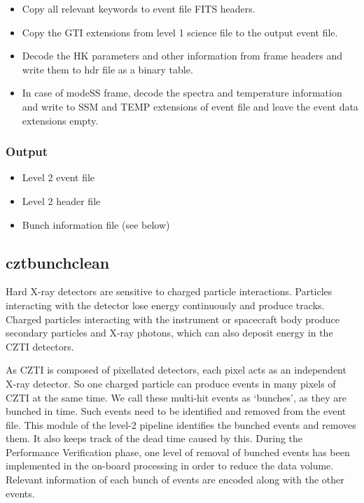 \documentclass[11pt,oneside,a4paper]{article}
\begin{document}
\begin{itemize}
\item{Copy all relevant keywords to event file FITS headers.}

\item{Copy the GTI extensions from level 1 science file to the output event file.}

\item{Decode the HK parameters and other information from frame headers and write them to hdr file
as a binary table.}

\item{In case of modeSS frame, decode the spectra and temperature information and write to SSM and TEMP extensions 
of event file and leave the event data extensions empty.}

\end{itemize}
\subsubsection*{Output}
\begin{itemize}
\item{Level 2 event file}
\item{Level 2 header file}
\item{Bunch information file} (see below)
\end{itemize}


\subsection{cztbunchclean}
Hard X-ray detectors are sensitive to charged particle interactions. Particles 
interacting with the detector lose energy continuously and produce tracks.
Charged particles interacting with the instrument or spacecraft body 
produce secondary particles and X-ray photons, 
which can also deposit energy in the CZTI detectors. 

As CZTI is composed of pixellated detectors, each pixel acts as an independent X-ray detector. 
So one charged particle can produce events in many pixels of CZTI at the same time. We call 
these multi-hit events as `bunches', as they are bunched in time. Such events need to be identified 
and removed from the event file. This module of the level-2 pipeline identifies 
the bunched events and removes them. It also keeps track of the dead time caused by this. 
During the Performance Verification phase, one level of removal of bunched events has been implemented 
in the on-board processing in order to reduce the data volume. Relevant information of 
each bunch of events are encoded along with the other events. 
\end{document}
